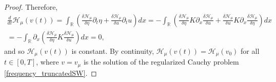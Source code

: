 \documentclass[10pt,a4paper]{amsart}
\newcommand{\R}{\mathbb{R}}
\begin{document}
\begin{proof}
%
Therefore,
\begin{multline*}
    \frac d{dt}
	\mathcal H_{\mu}(v(t))
    =
	\int_\R
	\left(
        \frac{\delta \mathcal H_{\mu}}{\delta \eta}
        \partial_t \eta
		+
        \frac{\delta \mathcal H_{\mu}}{\delta u}
        \partial_t u
	\right)
	dx
    =
    -
	\int_\R
	\left(
        \frac{\delta \mathcal H_{\mu}}{\delta \eta}
        K \partial_x
        \frac{\delta \mathcal H_{\mu}}{\delta u}
		+
        \frac{\delta \mathcal H_{\mu}}{\delta u}
        K \partial_x
        \frac{\delta \mathcal H_{\mu}}{\delta \eta}
	\right)
	dx
    \\
    =
    -
	\int_\R
    \partial_x
	\left(
        \frac{\delta \mathcal H_{\mu}}{\delta \eta}
        K
        \frac{\delta \mathcal H_{\mu}}{\delta u}
	\right)
	dx
    =
    0
    ,
\end{multline*}
%
and so $\mathcal H_{\mu}(v(t))$ is constant.
By continuity,
\(
    \mathcal H_{\mu}(v(t)) = \mathcal H_{\mu}(v_0)
\)
for all $t \in [0, T]$,
where
$v = v_{\mu}$ is the solution of the regularized Cauchy problem \eqref{frequency_truncatedSW}.



\end{proof}
\end{document}
